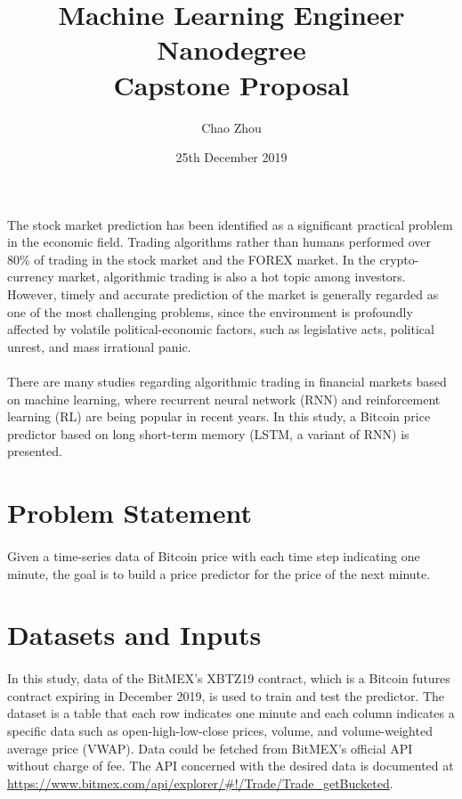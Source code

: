 \documentclass[12pt, letterpaper]{article}
\title{Machine Learning Engineer Nanodegree\\Capstone Proposal}
\author{Chao Zhou}
\date{25th December 2019}
\begin{document}
\maketitle

The stock market prediction has been identified as a significant practical problem in the economic field. Trading algorithms rather than humans performed over 80\% of trading in the stock market and the FOREX market. In the crypto-currency market, algorithmic trading is also a hot topic among investors. However, timely and accurate prediction of the market is generally regarded as one of the most challenging problems, since the environment is profoundly affected by volatile political-economic factors, such as legislative acts, political unrest, and mass irrational panic.

\paragraph{}
There are many studies regarding algorithmic trading in financial markets based on machine learning, where recurrent neural network (RNN) and reinforcement learning (RL) are being popular in recent years. In this study, a Bitcoin price predictor based on long short-term memory (LSTM, a variant of RNN) is presented.

\section{Problem Statement}

\paragraph{}
Given a time-series data of Bitcoin price with each time step indicating one minute, the goal is to build a price predictor for the price of the next minute.

\section{Datasets and Inputs}

\paragraph{}
In this study, data of the BitMEX's XBTZ19 contract, which is a Bitcoin futures contract expiring in December 2019, is used to train and test the predictor. The dataset is a table that each row indicates one minute and each column indicates a specific data such as open-high-low-close prices, volume, and volume-weighted average price (VWAP). Data could be fetched from BitMEX's official API without charge of fee. The API concerned with the desired data is documented at \url{https://www.bitmex.com/api/explorer/#!/Trade/Trade_getBucketed}.
\end{document}
